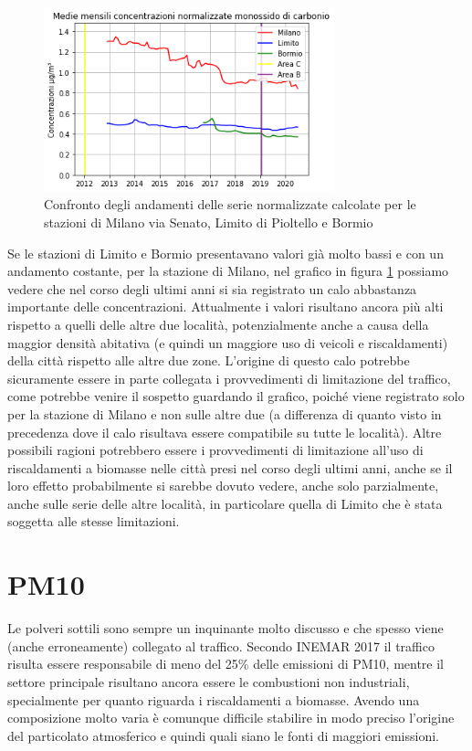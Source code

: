 \begin{figure}[h]
\centering
\includegraphics[width=0.75\textwidth]{co_traffico}
\caption{Confronto degli andamenti delle serie normalizzate calcolate per le stazioni di Milano via Senato, Limito di Pioltello e Bormio}
\label{fig:co_traffico}
\end{figure}

Se le stazioni di Limito e Bormio presentavano valori già molto bassi e con un andamento costante, per la stazione di Milano, nel grafico in figura \ref{fig:co_traffico} possiamo vedere che nel corso degli ultimi anni si sia registrato un calo abbastanza importante delle concentrazioni. Attualmente i valori risultano ancora più alti rispetto a quelli delle altre due località, potenzialmente anche a causa della maggior densità abitativa (e quindi un maggiore uso di veicoli e riscaldamenti) della città rispetto alle altre due zone.
L'origine di questo calo potrebbe sicuramente essere in parte collegata i provvedimenti di limitazione del traffico, come potrebbe venire il sospetto guardando il grafico, poiché viene registrato solo per la stazione di Milano e non sulle altre due (a differenza di quanto visto in precedenza dove il calo risultava essere compatibile su tutte le località). Altre possibili ragioni potrebbero essere i provvedimenti di limitazione all'uso di riscaldamenti a biomasse nelle città presi nel corso degli ultimi anni, anche se il loro effetto probabilmente si sarebbe dovuto vedere, anche solo parzialmente, anche sulle serie delle altre località, in particolare quella di Limito che è stata soggetta alle stesse limitazioni.

\section{PM10}
Le polveri sottili sono sempre un inquinante molto discusso e che spesso viene (anche erroneamente) collegato al traffico. Secondo INEMAR 2017 \cite{inemar2017} il traffico risulta essere responsabile di meno del 25\% delle emissioni di PM10, mentre il settore principale risultano ancora essere le combustioni non industriali, specialmente per quanto riguarda i riscaldamenti a biomasse. Avendo una composizione molto varia è comunque difficile stabilire in modo preciso l'origine del particolato atmosferico e quindi quali siano le fonti di maggiori emissioni.

